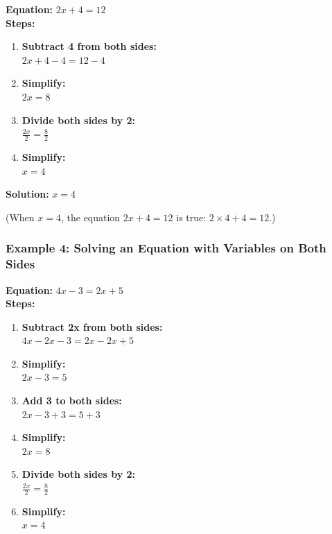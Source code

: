\documentclass[12pt]{article}
\begin{document}
\textbf{Equation:} \( 2x + 4 = 12 \)\\

\textbf{Steps:}

\begin{enumerate}
    \item \textbf{Subtract 4 from both sides:} \\
    \( 2x + 4 - 4 = 12 - 4 \)
    \item \textbf{Simplify:} \\
    \( 2x = 8 \)
    \item \textbf{Divide both sides by 2:} \\
    \( \frac{2x}{2} = \frac{8}{2} \)
    \item \textbf{Simplify:} \\
    \( x = 4 \)
\end{enumerate}

\textbf{Solution:} \( x = 4 \)

(When \( x = 4 \), the equation \( 2x + 4 = 12 \) is true: \( 2 \times 4 + 4 = 12 \).)

\newpage

\subsubsection*{Example 4: Solving an Equation with Variables on Both Sides}

\textbf{Equation:} \( 4x - 3 = 2x + 5 \)\\

\textbf{Steps:}

\begin{enumerate}
    \item \textbf{Subtract 2x from both sides:} \\
    \( 4x - 2x - 3 = 2x - 2x + 5 \)
    \item \textbf{Simplify:} \\
    \( 2x - 3 = 5 \)
    \item \textbf{Add 3 to both sides:} \\
    \( 2x - 3 + 3 = 5 + 3 \)
    \item \textbf{Simplify:} \\
    \( 2x = 8 \)
    \item \textbf{Divide both sides by 2:} \\
    \( \frac{2x}{2} = \frac{8}{2} \)
    \item \textbf{Simplify:} \\
    \( x = 4 \)
\end{enumerate}
\end{document}
